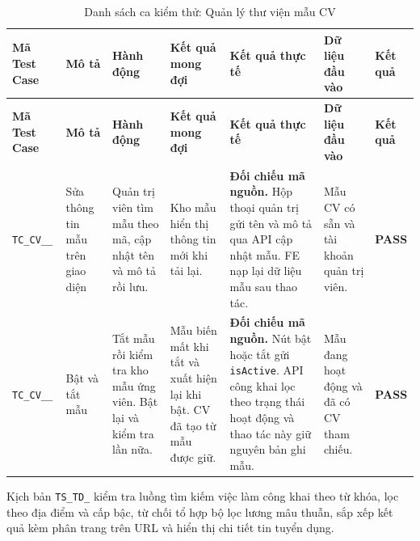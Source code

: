 \begin{landscape}
{
\fontsize{9.5}{11.5}\selectfont
\setlength{\tabcolsep}{3pt}
\renewcommand{\arraystretch}{1.2}
\begin{longtable}{|>{\raggedright\arraybackslash}p{2.1cm}|>{\raggedright\arraybackslash}p{2.8cm}|>{\raggedright\arraybackslash}p{3.8cm}|>{\raggedright\arraybackslash}p{4.0cm}|>{\raggedright\arraybackslash}p{5.0cm}|>{\raggedright\arraybackslash}p{3.2cm}|>{\centering\arraybackslash}p{1.3cm}|}
    \caption{Danh sách ca kiểm thử: Quản lý thư viện mẫu CV} \label{tab:ts-cv-03} \\
    \hline
    \textbf{Mã Test Case} & \textbf{Mô tả} & \textbf{Hành động} & \textbf{Kết quả mong đợi} & \textbf{Kết quả thực tế} & \textbf{Dữ liệu đầu vào} & \textbf{Kết quả} \\
    \hline
    \endfirsthead
    \hline
    \textbf{Mã Test Case} & \textbf{Mô tả} & \textbf{Hành động} & \textbf{Kết quả mong đợi} & \textbf{Kết quả thực tế} & \textbf{Dữ liệu đầu vào} & \textbf{Kết quả} \\
    \hline
    \endhead
    \hline
    \endfoot
    \hline
    \endlastfoot
    \texttt{TC\_\allowbreak CV\_\allowbreak 03\_\allowbreak 01} & Sửa thông tin mẫu trên giao diện & Quản trị viên tìm mẫu theo mã, cập nhật tên và mô tả rồi lưu. & Kho mẫu hiển thị thông tin mới khi tải lại. & \textbf{Đối chiếu mã nguồn.} Hộp thoại quản trị gửi tên và mô tả qua API cập nhật mẫu. FE nạp lại dữ liệu mẫu sau thao tác. & Mẫu CV có sẵn và tài khoản quản trị viên. & \textbf{PASS} \\
    \hline
    \texttt{TC\_\allowbreak CV\_\allowbreak 03\_\allowbreak 02} & Bật và tắt mẫu & Tắt mẫu rồi kiểm tra kho mẫu ứng viên. Bật lại và kiểm tra lần nữa. & Mẫu biến mất khi tắt và xuất hiện lại khi bật. CV đã tạo từ mẫu được giữ. & \textbf{Đối chiếu mã nguồn.} Nút bật hoặc tắt gửi \texttt{isActive}. API công khai lọc theo trạng thái hoạt động và thao tác này giữ nguyên bản ghi mẫu. & Mẫu đang hoạt động và đã có CV tham chiếu. & \textbf{PASS} \\
    \hline
\end{longtable}
}

Kịch bản \texttt{TS\_\allowbreak TD\_} kiểm tra luồng tìm kiếm việc làm công khai theo từ khóa, lọc theo địa điểm và cấp bậc, từ chối tổ hợp bộ lọc lương mâu thuẫn, sắp xếp kết quả kèm phân trang trên URL và hiển thị chi tiết tin tuyển dụng.


\end{landscape}
